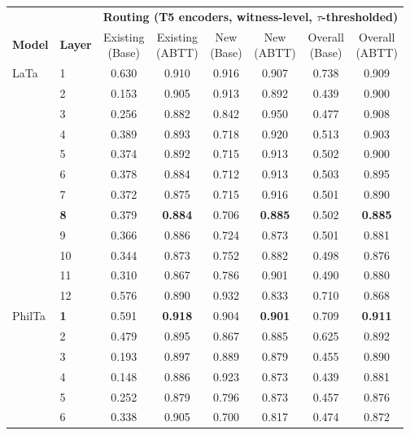 \begin{table}[t]
\centering
\scriptsize
\setlength{\tabcolsep}{3pt}
\begin{tabular}{llcccccc}
\toprule
\multicolumn{2}{c}{} & \multicolumn{6}{c}{\textbf{Routing (T5 encoders, witness-level, $\tau$-thresholded)}} \\
\cmidrule(lr){3-8}
\textbf{Model} & \textbf{Layer} & \makecell{Existing\\(Base)} & \makecell{Existing\\(ABTT)} & \makecell{New\\(Base)} & \makecell{New\\(ABTT)} & \makecell{Overall\\(Base)} & \makecell{Overall\\(ABTT)} \\
\midrule
LaTa & 1 & 0.630 & 0.910 & 0.916 & 0.907 & 0.738 & 0.909 \\
 & 2 & 0.153 & 0.905 & 0.913 & 0.892 & 0.439 & 0.900 \\
 & 3 & 0.256 & 0.882 & 0.842 & 0.950 & 0.477 & 0.908 \\
 & 4 & 0.389 & 0.893 & 0.718 & 0.920 & 0.513 & 0.903 \\
 & 5 & 0.374 & 0.892 & 0.715 & 0.913 & 0.502 & 0.900 \\
 & 6 & 0.378 & 0.884 & 0.712 & 0.913 & 0.503 & 0.895 \\
 & 7 & 0.372 & 0.875 & 0.715 & 0.916 & 0.501 & 0.890 \\
 & \textbf{8} & 0.379 & \textbf{0.884} & 0.706 & \textbf{0.885} & 0.502 & \textbf{0.885} \\
 & 9 & 0.366 & 0.886 & 0.724 & 0.873 & 0.501 & 0.881 \\
 & 10 & 0.344 & 0.873 & 0.752 & 0.882 & 0.498 & 0.876 \\
 & 11 & 0.310 & 0.867 & 0.786 & 0.901 & 0.490 & 0.880 \\
 & 12 & 0.576 & 0.890 & 0.932 & 0.833 & 0.710 & 0.868 \\
\midrule
PhilTa & \textbf{1} & 0.591 & \textbf{0.918} & 0.904 & \textbf{0.901} & 0.709 & \textbf{0.911} \\
 & 2 & 0.479 & 0.895 & 0.867 & 0.885 & 0.625 & 0.892 \\
 & 3 & 0.193 & 0.897 & 0.889 & 0.879 & 0.455 & 0.890 \\
 & 4 & 0.148 & 0.886 & 0.923 & 0.873 & 0.439 & 0.881 \\
 & 5 & 0.252 & 0.879 & 0.796 & 0.873 & 0.457 & 0.876 \\
 & 6 & 0.338 & 0.905 & 0.700 & 0.817 & 0.474 & 0.872 \\

\end{tabular}
\end{table}
